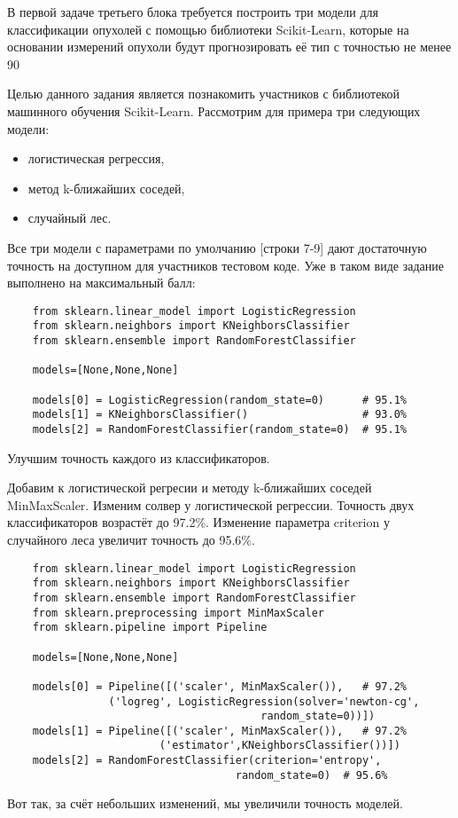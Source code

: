 \solutionSection

В первой задаче третьего блока требуется построить три модели для классификации опухолей с помощью библиотеки Scikit-Learn, которые на основании измерений опухоли будут прогнозировать её тип с точностью не менее 90%

Целью данного задания является познакомить участников с библиотекой машинного обучения Scikit-Learn. Рассмотрим для примера три следующих модели:

\begin{itemize}
    \item логистическая регрессия,
    \item метод k-ближайших соседей, 
    \item случайный лес.        
\end{itemize}

Все три модели с параметрами по умолчанию [строки 7-9] дают достаточную точность на доступном для участников тестовом коде. Уже в таком виде задание выполнено на максимальный балл:

\begin{verbatim}
    from sklearn.linear_model import LogisticRegression
    from sklearn.neighbors import KNeighborsClassifier
    from sklearn.ensemble import RandomForestClassifier

    models=[None,None,None]

    models[0] = LogisticRegression(random_state=0)      # 95.1%
    models[1] = KNeighborsClassifier()                  # 93.0%
    models[2] = RandomForestClassifier(random_state=0)  # 95.1%
\end{verbatim}

Улучшим точность каждого из классификаторов.

Добавим к логистической регресии и методу k-ближайших соседей MinMaxScaler. Изменим солвер у логистической регрессии. Точность двух классификаторов возрастёт до 97.2\%. Изменение параметра criterion у случайного леса увеличит точность до 95.6\%.

\begin{verbatim}
    from sklearn.linear_model import LogisticRegression
    from sklearn.neighbors import KNeighborsClassifier
    from sklearn.ensemble import RandomForestClassifier
    from sklearn.preprocessing import MinMaxScaler
    from sklearn.pipeline import Pipeline

    models=[None,None,None]
    
    models[0] = Pipeline([('scaler', MinMaxScaler()),   # 97.2%
                ('logreg', LogisticRegression(solver='newton-cg',
                                        random_state=0))])
    models[1] = Pipeline([('scaler', MinMaxScaler()),   # 97.2%
                        ('estimator',KNeighborsClassifier())])
    models[2] = RandomForestClassifier(criterion='entropy',
                                    random_state=0)  # 95.6%

\end{verbatim}

Вот так, за счёт небольших изменений, мы увеличили точность моделей.

